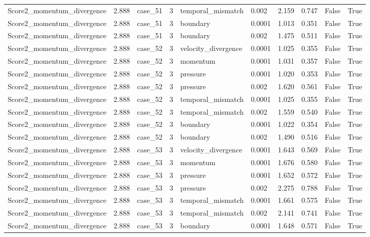\begin{longtable}{llllllllll}
Score2\_momentum\_divergence & 2.888 & case\_51 & 3 & temporal\_mismatch & 0.002 & 2.159 & 0.747 & False & True \\
Score2\_momentum\_divergence & 2.888 & case\_51 & 3 & boundary & 0.0001 & 1.013 & 0.351 & False & True \\
Score2\_momentum\_divergence & 2.888 & case\_51 & 3 & boundary & 0.002 & 1.475 & 0.511 & False & True \\
Score2\_momentum\_divergence & 2.888 & case\_52 & 3 & velocity\_divergence & 0.0001 & 1.025 & 0.355 & False & True \\
Score2\_momentum\_divergence & 2.888 & case\_52 & 3 & momentum & 0.0001 & 1.031 & 0.357 & False & True \\
Score2\_momentum\_divergence & 2.888 & case\_52 & 3 & pressure & 0.0001 & 1.020 & 0.353 & False & True \\
Score2\_momentum\_divergence & 2.888 & case\_52 & 3 & pressure & 0.002 & 1.620 & 0.561 & False & True \\
Score2\_momentum\_divergence & 2.888 & case\_52 & 3 & temporal\_mismatch & 0.0001 & 1.025 & 0.355 & False & True \\
Score2\_momentum\_divergence & 2.888 & case\_52 & 3 & temporal\_mismatch & 0.002 & 1.559 & 0.540 & False & True \\
Score2\_momentum\_divergence & 2.888 & case\_52 & 3 & boundary & 0.0001 & 1.022 & 0.354 & False & True \\
Score2\_momentum\_divergence & 2.888 & case\_52 & 3 & boundary & 0.002 & 1.490 & 0.516 & False & True \\
Score2\_momentum\_divergence & 2.888 & case\_53 & 3 & velocity\_divergence & 0.0001 & 1.643 & 0.569 & False & True \\
Score2\_momentum\_divergence & 2.888 & case\_53 & 3 & momentum & 0.0001 & 1.676 & 0.580 & False & True \\
Score2\_momentum\_divergence & 2.888 & case\_53 & 3 & pressure & 0.0001 & 1.652 & 0.572 & False & True \\
Score2\_momentum\_divergence & 2.888 & case\_53 & 3 & pressure & 0.002 & 2.275 & 0.788 & False & True \\
Score2\_momentum\_divergence & 2.888 & case\_53 & 3 & temporal\_mismatch & 0.0001 & 1.661 & 0.575 & False & True \\
Score2\_momentum\_divergence & 2.888 & case\_53 & 3 & temporal\_mismatch & 0.002 & 2.141 & 0.741 & False & True \\
Score2\_momentum\_divergence & 2.888 & case\_53 & 3 & boundary & 0.0001 & 1.648 & 0.571 & False & True \\

\end{longtable}

